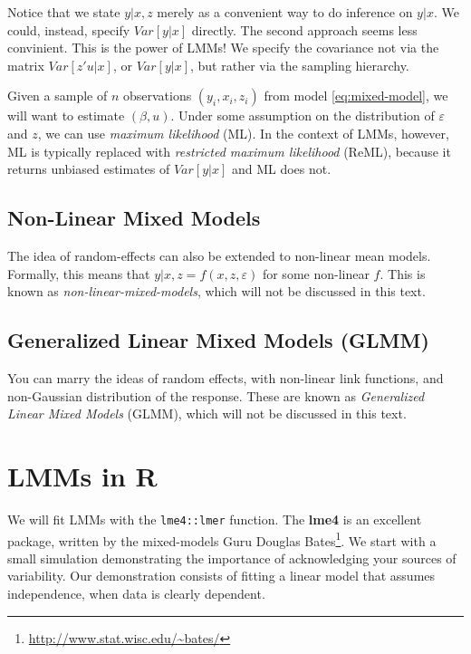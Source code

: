 \documentclass[]{book}
\renewcommand{\href}[2]{#2\footnote{\url{#1}}}
\theoremstyle{definition}
\theoremstyle{definition}
\theoremstyle{definition}
\theoremstyle{remark}
\begin{document}
Notice that we state \(y|x,z\) merely as a convenient way to do inference on \(y|x\).
We could, instead, specify \(Var[y|x]\) directly.
The second approach seems less convinient.
This is the power of LMMs!
We specify the covariance not via the matrix \(Var[z'u|x]\), or \(Var[y|x]\), but rather via the sampling hierarchy.

Given a sample of \(n\) observations \((y_i,x_i,z_i)\) from model \eqref{eq:mixed-model}, we will want to estimate \((\beta,u)\).
Under some assumption on the distribution of \(\varepsilon\) and \(z\), we can use \emph{maximum likelihood} (ML).
In the context of LMMs, however, ML is typically replaced with \emph{restricted maximum likelihood} (ReML), because it returns unbiased estimates of \(Var[y|x]\) and ML does not.

\hypertarget{non-linear-mixed-models}{%
\subsection{Non-Linear Mixed Models}\label{non-linear-mixed-models}}

The idea of random-effects can also be extended to non-linear mean models.
Formally, this means that \(y|x,z=f(x,z,\varepsilon)\) for some non-linear \(f\).
This is known as \emph{non-linear-mixed-models}, which will not be discussed in this text.

\hypertarget{generalized-linear-mixed-models-glmm}{%
\subsection{Generalized Linear Mixed Models (GLMM)}\label{generalized-linear-mixed-models-glmm}}

You can marry the ideas of random effects, with non-linear link functions, and non-Gaussian distribution of the response.
These are known as \emph{Generalized Linear Mixed Models} (GLMM), which will not be discussed in this text.

\hypertarget{lmms-in-r}{%
\section{LMMs in R}\label{lmms-in-r}}

We will fit LMMs with the \texttt{lme4::lmer} function.
The \textbf{lme4} is an excellent package, written by the mixed-models Guru \href{http://www.stat.wisc.edu/~bates/}{Douglas Bates}.
We start with a small simulation demonstrating the importance of acknowledging your sources of variability.
Our demonstration consists of fitting a linear model that assumes independence, when data is clearly dependent.
\end{document}
